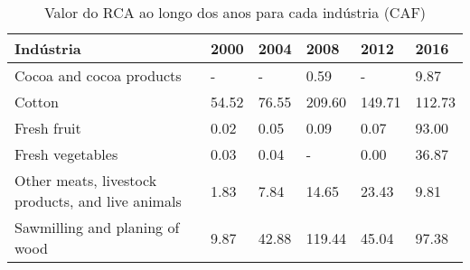 \begin{table}
\centering
\caption{Valor do RCA ao longo dos anos para cada indústria (CAF)}
\begin{tabular}{p{6cm}p{1.5cm}p{1.5cm}p{1.5cm}p{1.5cm}p{1.5cm}}
\toprule
                                        Indústria &  2000 &  2004 &   2008 &   2012 &   2016 \\
\midrule
                         Cocoa and cocoa products &     - &     - &   0.59 &      - &   9.87 \\
                                           Cotton & 54.52 & 76.55 & 209.60 & 149.71 & 112.73 \\
                                      Fresh fruit &  0.02 &  0.05 &   0.09 &   0.07 &  93.00 \\
                                 Fresh vegetables &  0.03 &  0.04 &      - &   0.00 &  36.87 \\
Other meats, livestock products, and live animals &  1.83 &  7.84 &  14.65 &  23.43 &   9.81 \\
                   Sawmilling and planing of wood &  9.87 & 42.88 & 119.44 &  45.04 &  97.38 \\
\bottomrule
\end{tabular}
\end{table}
